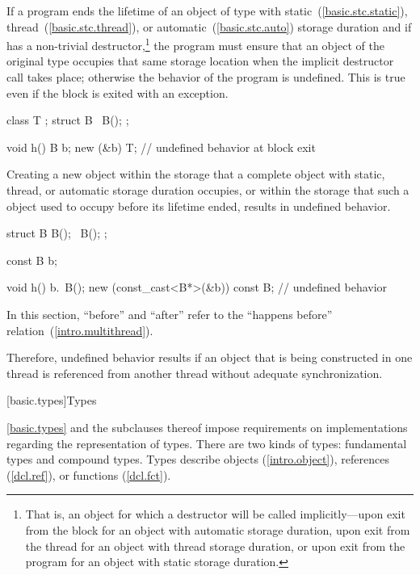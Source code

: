 \pnum
If a program ends the lifetime of an object of type  with
static~(\ref{basic.stc.static}), thread~(\ref{basic.stc.thread}),
or automatic~(\ref{basic.stc.auto})
storage duration and if  has a non-trivial destructor,\footnote{That
is, an object for which a destructor will be called
implicitly---upon exit from the block for an object with
automatic storage duration, upon exit from the thread for an object with
thread storage duration, or upon exit from the program for an object
with static storage duration.}
the program must ensure that an object of the original type occupies
that same storage location when the implicit destructor call takes
place; otherwise the behavior of the program is undefined. This is true
even if the block is exited with an exception. \begin{example}

\begin{codeblock}
class T { };
struct B {
   ~B();
};

void h() {
   B b;
   new (&b) T;
}                               // undefined behavior at block exit
\end{codeblock}
\end{example}

\pnum
Creating a new object within the storage that a  complete
object with static, thread, or automatic storage duration occupies,
or within the storage that such a  object used to occupy before
its lifetime ended, results in undefined behavior.
\begin{example}
\begin{codeblock}
struct B {
  B();
  ~B();
};

const B b;

void h() {
  b.~B();
  new (const_cast<B*>(&b)) const B;     // undefined behavior
}
\end{codeblock}
\end{example}

\pnum
In this section, ``before'' and ``after'' refer to the ``happens before''
relation~(\ref{intro.multithread}). \begin{note} Therefore, undefined behavior results
if an object that is being constructed in one thread is referenced from another
thread without adequate synchronization. \end{note}%

[basic.types]{Types}%

\pnum
\begin{note}
\ref{basic.types} and the subclauses thereof
impose requirements on implementations regarding the representation
of types.
There are two kinds of types: fundamental types and compound types.
Types describe objects (\ref{intro.object}),
references (\ref{dcl.ref}),
or functions (\ref{dcl.fct}).
\end{note}

